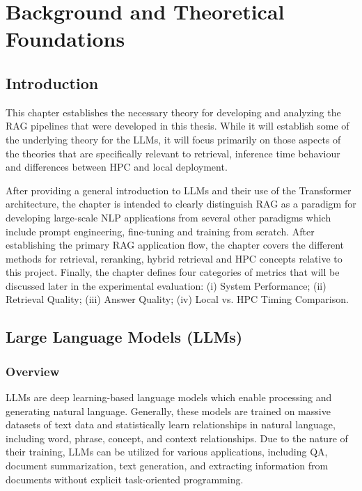 \chapter{Background and Theoretical Foundations}

\section{Introduction}

This chapter establishes the necessary theory for developing and analyzing the \ac{RAG} pipelines that were developed in this thesis. While it will establish some of the underlying theory for the \acfp{LLM}, it will focus primarily on those aspects of the theories that are specifically relevant to retrieval, inference time behaviour and differences between \acf{HPC} and local deployment.

After providing a general introduction to \acp{LLM} and their use of the Transformer architecture, the chapter is intended to clearly distinguish \ac{RAG} as a paradigm for developing large-scale \acf{NLP} applications from several other paradigms which include prompt engineering, fine-tuning and training from scratch. After establishing the primary \ac{RAG} application flow, the chapter covers the different methods for retrieval, reranking, hybrid retrieval and \ac{HPC} concepts relative to this project. Finally, the chapter defines four categories of metrics that will be discussed later in the experimental evaluation: (i) System Performance; (ii) Retrieval Quality; (iii) Answer Quality; (iv) Local vs. HPC Timing Comparison.

\section{Large Language Models (LLMs)}

\subsection{Overview}

\acp{LLM} are deep learning-based language models which enable processing and generating natural language. Generally, these models are trained on massive datasets of text data and statistically learn relationships in natural language, including word, phrase, concept, and context relationships. Due to the nature of their training, \acp{LLM} can be utilized for various applications, including \ac{QA}, document summarization, text generation, and extracting information from documents without explicit task-oriented programming.

